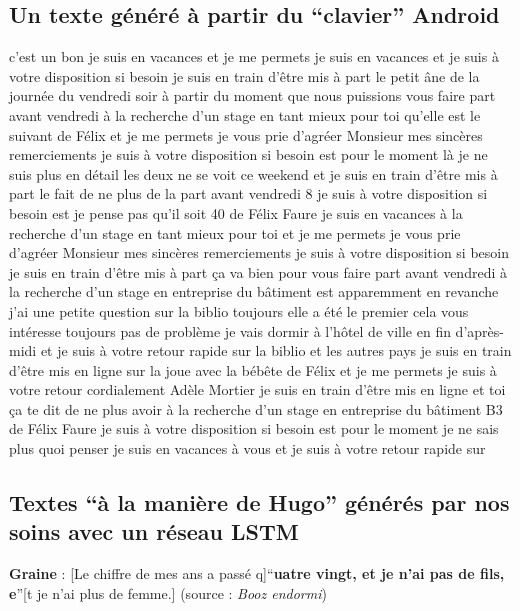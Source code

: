 \documentclass{article}
\begin{document}
		\subsection{Un texte généré à partir du ``clavier'' Android}\label{android}
			c'est un bon je suis en vacances et je me permets je suis en vacances et je suis à votre disposition si besoin je suis en train d'être mis à part le petit âne de la journée du vendredi soir à partir du moment que nous puissions vous faire part avant vendredi à la recherche d'un stage en tant mieux pour toi qu'elle est le suivant de Félix et je me permets je vous prie d'agréer Monsieur mes sincères remerciements je suis à votre disposition si besoin est pour le moment là je ne suis plus en détail les deux ne se voit ce weekend et je suis en train d'être mis à part le fait de ne plus de la part avant vendredi 8 je suis à votre disposition si besoin est je pense pas qu'il soit 40 de Félix Faure je suis en vacances à la recherche d'un stage en tant mieux pour toi et je me permets je vous prie d'agréer Monsieur mes sincères remerciements je suis à votre disposition si besoin je suis en train d'être mis à part ça va bien pour vous faire part avant vendredi à la recherche d'un stage en entreprise du bâtiment est apparemment en revanche j'ai une petite question sur la biblio toujours elle a été le premier cela vous intéresse toujours pas de problème je vais dormir à l'hôtel de ville en fin d'après-midi et je suis à votre retour rapide sur la biblio et les autres pays je suis en train d'être mis en ligne sur la joue avec la bébête de Félix et je me permets je suis à votre retour cordialement Adèle Mortier je suis en train d'être mis en ligne et toi ça te dit de ne plus avoir à la recherche d'un stage en entreprise du bâtiment B3 de Félix Faure je suis à votre disposition si besoin est pour le moment je ne sais plus quoi penser je suis en vacances à vous et je suis à votre retour rapide sur
			\newpage
		\subsection{Textes ``à la manière de Hugo'' générés par nos soins avec un réseau LSTM}\label{lstm_hugo_ex}
			\textbf{Graine} : [Le chiffre de mes ans a passé q]``\textbf{uatre vingt, et je n'ai pas de fils, e}''[t je n'ai plus de femme.] (source : \textit{Booz endormi})
\end{document}
